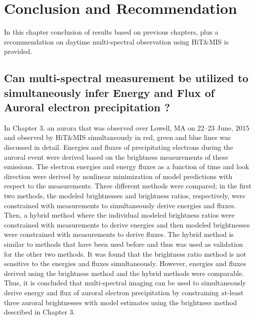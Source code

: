 \documentclass[crop=false,class=mitthesis,oneside,font=12pt]{standalone}
\begin{document}
\chapter{Conclusion and Recommendation}
In this chapter conclusion of results based on previous chapters, plus a recommendation on daytime multi-spectral observation using HiT\&MIS is provided.
\section{Can multi-spectral measurement be utilized to simultaneously infer Energy and Flux of Auroral electron precipitation ?}
In Chapter 3, an aurora that was observed over Lowell, MA on 22–23 June, 2015 and observed by HiT\&MIS simultaneously in red, green and blue lines was discussed in detail. Energies and fluxes of precipitating electrons during the auroral event were derived based on the brightness measurements of these emissions. The electron energies and energy fluxes as a function of time and look direction were derived by nonlinear minimization of model predictions with respect to the measurements. Three different methods were compared; in the first two methods, the modeled brightnesses and brightness ratios, respectively, were constrained with measurements to simultaneously derive energies and fluxes. Then, a hybrid method where the individual modeled brightness ratios were constrained with measurements to derive energies and then  modeled brightnesses were constrained with measurements to derive fluxes. The hybrid method is similar to methods that have been used before and thus was used as validation for the other two methods. It was found that the brightness ratio method is not sensitive to the energies and fluxes simultaneously. However, energies and fluxes derived using the brightness method and the hybrid methods were comparable. Thus, it is concluded that multi-spectral imaging can be used to simultaneously derive energy and flux of auroral electron precipitation by constraining at-least three auroral brightnesses with model estimates using the brightness method described in Chapter 3.

\end{document}
